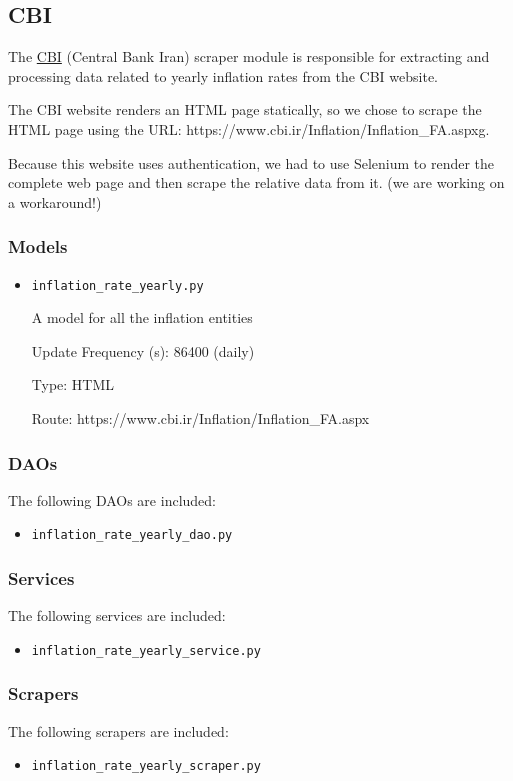 {	\newpage
	\subsection{CBI}
	The \hyperlink{https://www.cbi.ir/}{CBI} (Central Bank Iran) scraper module is responsible for extracting and processing data related to yearly inflation rates from the CBI website.

	The CBI website renders an HTML page statically, so we chose to scrape the HTML page using the URL: https://www.cbi.ir/Inflation/Inflation\_FA.aspxg.

	Because this website uses authentication, we had to use Selenium to render the complete web page and then scrape the relative data from it. (we are working on a workaround!)

	\subsubsection{Models}

	\begin{itemize}
	  \item \texttt{inflation\_rate\_yearly.py}

	  A model for all the inflation entities

	  Update Frequency (s): 86400 (daily)

	  Type: HTML

	  Route: https://www.cbi.ir/Inflation/Inflation\_FA.aspx


	\end{itemize}

	\subsubsection{DAOs}

	The following DAOs are included:

	\begin{itemize}
	  \item \texttt{inflation\_rate\_yearly\_dao.py}
	\end{itemize}

	\subsubsection{Services}

	The following services are included:

	\begin{itemize}
	  \item \texttt{inflation\_rate\_yearly\_service.py}
	\end{itemize}

	\subsubsection{Scrapers}

	The following scrapers are included:

	\begin{itemize}
	  \item \texttt{inflation\_rate\_yearly\_scraper.py}
	\end{itemize}}

